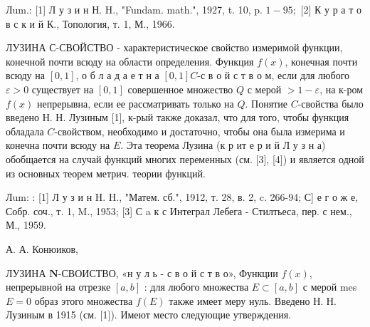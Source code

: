 \documentclass[10pt]{article}
\begin{document}
Лum.: [1] Л у з и н Н. H., "Fundam. math.", 1927, t. 10, p. $1-95 ;$ [2] К у р а т о в с к и й К., Топология, т. 1, М., 1966.



ЛУЗИНА С-СВОЙСТВО - характеристическое свойство измеримой функции, конечной почти всюду на области определения. Функция $f(x)$, конечная почти всюду на $[0,1]$, о б л а д а е т н а $[0,1] C$-с в о й с т в о м, если для любого $\varepsilon>0$ существует на $[0,1]$ совершенное множество $Q$ с мерой $>1-\varepsilon$, на к-ром $f(x)$ непрерывна, если ее рассматривать только на $Q$. Понятие $C$-свойства было введено Н. Н. Лузиным [1], к-рый также доказал, что для того, чтобы функция обладала $C$-свойством, необходимо и достаточно, чтобы она была измерима и конечна почти всюду на $E$. Эта теорема Лузина (к р ит е р и й Л у з н а) обобщается на случай функций многих переменных (см. [3], [4]) и является одной из основных теорем метрич. теории функций.



Лum: : [1] Л у з и н H. H., "Матем. сб.", 1912, т. 28, в. 2, c. 266-94; С] е г о ж е, Собр. соч., т. 1, M., 1953; [3] С a к с Интеграл Лебега - Стилтьеса, пер. с нем., М., 1959.



А. А. Конюиков,



ЛУЗИНА $\boldsymbol{N}$-СВОИСТВО, «н у л ь - с в о й с т в о», Функции $f(x)$, непрерывной на отрезке $[a, b]$ : для любого множества $E \subset[a, b]$ с мерой mes $E=0$ образ этого множества $f(E)$ также имеет меру нуль. Введено Н. Н. Лузиным в 1915 (см. [1]). Имеют место следующие утверждения.
\end{document}
